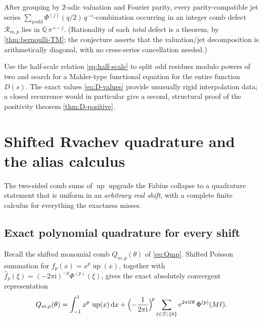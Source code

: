 \documentclass[11pt,oneside]{article}
\numberwithin{equation}{section}
\theoremstyle{definition}
\theoremstyle{remark}
\newcommand{\Q}{\mathbb Q}
\newcommand{\Z}{\mathbb Z}
\newcommand{\dd}{\,\mathrm d}
\newcommand{\e}{\mathrm e}
\newcommand{\ii}{\mathrm i}
\newcommand{\Up}{\operatorname{up}}
\newcommand{\defect}{\mathcal R}
\begin{document}
\begin{conjecture}
\label{conj:jets}
After grouping by $2$-adic valuation and Fourier parity, every
parity-compatible jet series
$\sum_{q\,\mathrm{odd}}\Phi^{(j)}(q/2)\,q^{-s}$-combination occurring
in an integer comb defect $\defect_{m,p}$ lies in
$\Q\,\pi^{\,s-j}$.  (Rationality of each \emph{total} defect is a
theorem, by \cref{thm:bernoulli-TM}; the conjecture asserts that the
valuation/jet decomposition is arithmetically diagonal, with no
cross-series cancellation needed.)
\end{conjecture}

\begin{problem}
\label{prob:D-recurrence}
Use the half-scale relation \eqref{eq:half-scale} to split odd residues
modulo powers of two and search for a Mahler-type functional equation
for the entire function $D(s)$.  The exact values
\eqref{eq:D-values} provide unusually rigid interpolation data; a
closed recurrence would in particular give a second, structural proof
of the positivity theorem \cref{thm:D-positive}.
\end{problem}

\section{Shifted Rvachev quadrature and the alias calculus}
\label{sec:up-comb}

The two-sided comb sums of $\Up$ upgrade the Fabius collapse to a
quadrature statement that is uniform in an \emph{arbitrary real
shift}, with a complete finite calculus for everything the exactness
misses.

\subsection{Exact polynomial quadrature for every shift}

Recall the shifted monomial comb
$Q_{m,p}(\theta)$ of \eqref{eq:Qmp}.  Shifted Poisson summation for
$f_p(x)=x^{p}\Up(x)$, together with
$\widehat f_p(\xi)=(-2\pi\ii)^{-p}\Phi^{(p)}(\xi)$, gives the exact
absolutely convergent representation
\begin{equation}
 Q_{m,p}(\theta)
 =\int_{-1}^{1}x^{p}\,\Up(x)\dd x
 +\Bigl(-\frac{1}{2\pi\ii}\Bigr)^{\!p}
 \sum_{\ell\in\Z\setminus\{0\}}
 \e^{2\pi\ii\ell\theta}\,\Phi^{(p)}(M\ell).
 \label{eq:Q-Poisson}
\end{equation}
\end{document}
